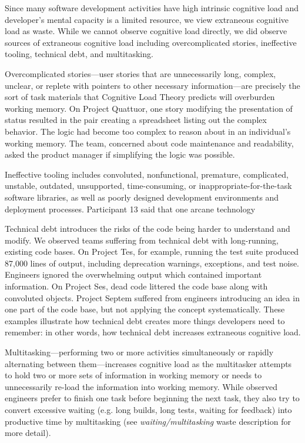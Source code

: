 Since many software development activities have high intrinsic cognitive load and developer's mental capacity is a limited resource, we view extraneous cognitive load as waste. While we cannot observe cognitive load directly, we did observe sources of extraneous cognitive load including overcomplicated stories, ineffective tooling, technical debt, and multitasking.

Overcomplicated stories---user stories that are unnecessarily long, complex, unclear, or replete with pointers to other necessary information---are precisely the sort of task materials that Cognitive Load Theory predicts will overburden working memory.  On Project Quattuor, one story modifying the presentation of status resulted in the pair creating a spreadsheet listing out the complex behavior. The logic had become too complex to reason about in an individual's working memory. The team, concerned about code maintenance and readability, asked the product manager if simplifying the logic was possible.

Ineffective tooling includes convoluted, nonfunctional, premature, complicated, unstable, outdated, unsupported, time-consuming, or inappropriate-for-the-task software libraries, as well as poorly designed development environments and deployment processes. Participant 13 said that one arcane technology 

Technical debt introduces the risks of the  code being harder to understand and modify. We observed teams suffering from technical debt with long-running, existing code bases. On Project Tes, for example, running the test suite produced 87,000 lines of output, including deprecation warnings, exceptions, and test noise. Engineers ignored the overwhelming output which contained important information. On Project Ses, dead code littered the code base along with convoluted objects. Project Septem suffered from engineers introducing an idea in one part of the code base, but not applying the concept systematically. These examples illustrate how technical debt creates more things developers need to remember: in other words, how technical debt increases extraneous cognitive load. 

Multitasking---performing two or more activities simultaneously or rapidly alternating between them---increases cognitive load as the multitasker attempts to hold two or more sets of information in working memory or needs to unnecessarily re-load the information into working memory. While observed engineers prefer to finish one task before beginning the next task, they also try to convert excessive waiting (e.g. long builds, long tests, waiting for feedback) into productive time by multitasking (see \textit{waiting/multitasking} waste description for more detail).

